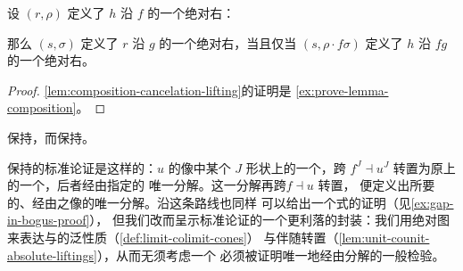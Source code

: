 \begin{lemma}\label{lem:composition-cancelation-lifting}
设 $(r,\rho)$ 定义了 $h$ 沿 $f$ 的一个绝对右\trLifting：
\begin{center}
\end{center}
那么 $(s,\sigma)$ 定义了 $r$ 沿 $g$ 的一个绝对右\trLifting，当且仅当
$(s,\rho\cdot f\sigma)$ 定义了 $h$ 沿 $fg$ 的一个绝对右\trLifting。
\end{lemma}

\begin{proof}
\cref{lem:composition-cancelation-lifting}的证明是%
\cref{ex:prove-lemma-composition}。
\end{proof}

\begin{theorem}\label{thm:right-adjoints-preserve-limits}
\trRightAdjoint{}保持\trLimit，而\trLeftAdjoint{}保持\trColimit。
\end{theorem}

\trRightAdjoint{}保持\trLimit{}的标准论证是这样的：\trRightAdjoint $u$
的像中某个 $J$ 形状\trDiagram{}上的一个\trCone，跨\trAdjunction
$f^{J}\dashv u^{J}$ 转置为原\trDiagram{}上的一个\trCone，后者经由指定的%
\trLimit\trCone{}唯一分解。这一分解再跨\trAdjunction $f\dashv u$ 转置，
便定义出所要的、经由\trLimit\trCone{}之像的唯一分解。沿这条路线也同样
可以给出一个\trInfinityCategory{}式的证明（见\cref{ex:gap-in-bogus-proof}），
但我们改而呈示标准论证的一个更利落的封装：我们用绝对\trLifting{}图
来表达\trLimit{}与\trColimit{}的泛性质（\cref{def:limit-colimit-cones}）
与伴随转置（\cref{lem:unit-counit-absolute-liftings}），从而无须考虑一个
必须被证明唯一地经由\trLimit\trCone{}分解的一般检验\trCone。


